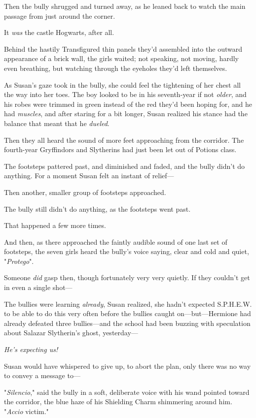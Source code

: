 Then the bully shrugged and turned away, as he leaned back to watch the main 
passage from just around the corner.

It \emph{was} the castle Hogwarts, after all.

Behind the hastily Transfigured thin panels they'd assembled into the outward 
appearance of a brick wall, the girls waited; not speaking, not moving, hardly 
even breathing, but watching through the eyeholes they'd left themselves.

As Susan's gaze took in the bully, she could feel the tightening of her chest 
all the way into her toes. The boy looked to be in his seventh-year if not 
\emph{older}, and his robes were trimmed in green instead of the red they'd 
been hoping for, and he had \emph{muscles}, and after staring for a bit longer, 
Susan realized his stance had the balance that meant that he \emph{dueled}.

Then they all heard the sound of more feet approaching from the corridor. The 
fourth-year Gryffindors and Slytherins had just been let out of Potions class.

The footsteps pattered past, and diminished and faded, and the bully didn't do 
anything. For a moment Susan felt an instant of relief---

Then another, smaller group of footsteps approached.

The bully still didn't do anything, as the footsteps went past.

That happened a few more times.

And then, as there approached the faintly audible sound of one last set of 
footsteps, the seven girls heard the bully's voice saying, clear and cold and 
quiet, "\emph{Protego}".

Someone \emph{did} gasp then, though fortunately very very quietly. If they 
couldn't get in even a single shot---

The bullies were learning \emph{already}, Susan realized, she hadn't expected 
S.P.H.E.W. to be able to do this very often before the bullies caught 
on---but---Hermione had already defeated three bullies---and the school had 
been buzzing with speculation about Salazar Slytherin's ghost, yesterday---

\emph{He's expecting us!}

Susan would have whispered to give up, to abort the plan, only there was no way 
to convey a message to---

"\emph{Silencio}," said the bully in a soft, deliberate voice with his wand 
pointed toward the corridor, the blue haze of his Shielding Charm shimmering 
around him. "\emph{Accio} victim."

